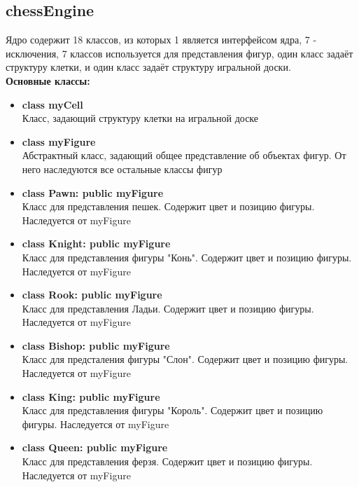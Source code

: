\subsection*{chessEngine}
Ядро содержит 18 классов, из которых 1 является интерфейсом ядра, 7 - исключения, 7 классов используется для представления фигур, один класс задаёт структуру клетки, и один класс задаёт структуру игральной доски.\\
\textbf{Основные классы:}\\
\begin{itemize}
\item\textbf{class myCell}\\
Класс, задающий структуру клетки на игральной доске\\
\item\textbf{class myFigure}\\
Абстрактный класс, задающий общее представление об объектах фигур. От него наследуются все остальные классы фигур\\
\item\textbf{class Pawn: public myFigure}\\
Класс для представления пешек. Содержит цвет и позицию фигуры. Наследуется от myFigure\\
\item\textbf{class Knight: public myFigure}\\
Класс для представления фигуры "Конь". Содержит цвет и позицию фигуры. Наследуется от myFigure\\
\item\textbf{class Rook: public myFigure}\\
Класс для представления Ладьи. Содержит цвет и позицию фигуры. Наследуется от myFigure\\
\item\textbf{class Bishop: public myFigure}\\
Класс для предсталения фигуры "Слон". Содержит цвет и позицию фигуры. Наследуется от myFigure\\
\item\textbf{class King: public myFigure}\\
Класс для представления фигуры "Король". Содержит цвет и позицию фигуры. Наследуется от myFigure\\
\item\textbf{class Queen: public myFigure}\\
Класс для представления ферзя. Содержит цвет и позицию фигуры. Наследуется от myFigure\\

\end{itemize}
